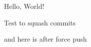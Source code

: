 \documentclass{article}
\begin{document}
Hello, World!

Test to squash commits

and here is after force push
\end{document}
